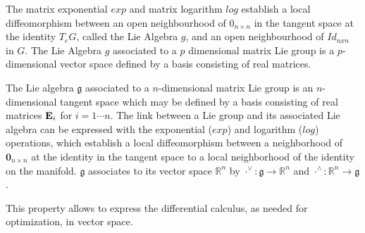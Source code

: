 \documentclass[a4paper]{report}
\begin{document}
The matrix exponential $exp$ and matrix logarithm $log$ establish a local
diffeomorphism between an open neighbourhood of $0_{n \times n}$ in the
tangent space at the identity $T_eG$, called the Lie Algebra $g$, and an
open neighbourhood of $Id_{nxn}$ in $G$. The Lie Algebra $g$ associated to a
$p$ dimensional matrix Lie group is a $p$-dimensional vector space defined
by a basis consisting of real matrices.


The Lie algebra $\mathfrak{g}$ associated to a $n$-dimensional matrix Lie group is an $n$-dimensional tangent space which may be defined by a basis consisting of real matrices $\bold{E}_i$ for $i=1 \cdots n$. The link between a Lie group and its associated Lie algebra can be expressed with the exponential ($exp$) and logarithm ($log$) operations, which establish a local diffeomorphism between a neighborhood of $\bm{0}_{n \times n}$ at the identity in the tangent space to a local neighborhood of the identity on the manifold. $\mathfrak{g}$ associates to its vector space $\mathbb{R}^{n}$ by ${\cdot}^{\vee}: \mathfrak{g} \to \mathbb{R}^n$ and ${\cdot}^{\land}: \mathbb{R}^n \to \mathfrak{g}$.

This property allows to express the differential calculus, as needed for optimization, in vector space.
\end{document}
